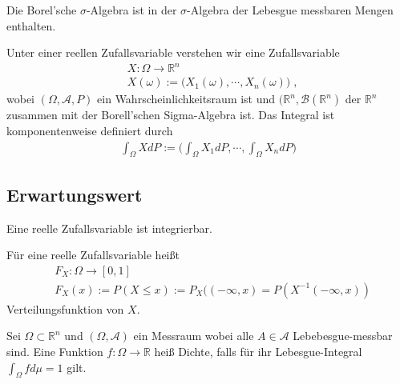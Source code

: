 \begin{Satz}
Die Borel'sche   $\sigma$-Algebra ist in der $\sigma$-Algebra der Lebesgue messbaren Mengen enthalten.
\end{Satz}

\begin{Definition}
Unter einer reellen Zufallsvariable verstehen wir eine Zufallsvariable 
\begin{align*}
& X : \Omega \to \mathbb{R}^n \\
& X(\omega) := \biggl(X_1(\omega), \cdots , X_n(\omega)  \biggr) \; ,
\end{align*}
wobei $(\Omega, \mathcal{A}, P)$ ein Wahrscheinlichkeitsraum ist und $(\mathbb{R}^n, \mathcal{B}(\mathbb{R}^n)$ der $\mathbb{R}^n$ zusammen mit der Borell'schen Sigma-Algebra ist. Das Integral ist komponentenweise definiert durch
\begin{align*} 
\int_{\Omega} X dP :=  \biggl( \int_{\Omega} X_1 dP, \cdots , \int_{\Omega} X_n dP    \biggr)
\end{align*}

\end{Definition}



\subsection{Erwartungswert}
\begin{Satz}
Eine reelle Zufallsvariable ist integrierbar.
\end{Satz}

\begin{Definition}
Für eine reelle Zufallsvariable heißt 
\begin{align*} 
& F_X : \Omega \to [0,1] \\
& F_X (x) := P (X \leq x) := P_X (( -\infty, x ) = P(X^{-1} (-\infty, x))
\end{align*}
Verteilungsfunktion von $X$.
\end{Definition}




\begin{Definition}
Sei $\Omega \subset \mathbb{R}^n$ und $(\Omega, \mathcal{A})$ ein Messraum wobei alle $A \in \mathcal{A}$ Lebebesgue-messbar sind.
 Eine Funktion $f: \Omega \to \mathbb{R}$ heiß Dichte, falls für ihr Lebesgue-Integral $\int_{\Omega} f d \mu = 1$ gilt.
\end{Definition}

